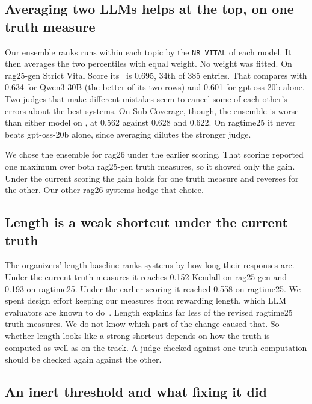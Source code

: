 \subsection{Averaging two LLMs helps at the top, on one truth measure}
\label{sec:ensemble}

Our ensemble ranks runs within each topic by the \texttt{NR\_VITAL} of each model.
It then averages the two percentiles with equal weight. No weight was fitted. On
rag25-gen Strict Vital Score its \tauap\ is 0.695, 34th of 385 entries. That
compares with 0.634 for Qwen3-30B (the better of its two rows) and 0.601 for
gpt-oss-20b alone. Two judges that make different mistakes seem to cancel some of
each other's errors about the best systems. On Sub Coverage, though, the ensemble
is worse than either model on \tauap, at 0.562 against 0.628 and 0.622. On
ragtime25 it never beats gpt-oss-20b alone, since averaging dilutes the stronger
judge.

We chose the ensemble for rag26 under the earlier scoring. That scoring reported
one maximum over both rag25-gen truth measures, so it showed only the gain. Under
the current scoring the gain holds for one truth measure and reverses for the
other. Our other rag26 systems hedge that choice.

\subsection{Length is a weak shortcut under the current truth}

The organizers' length baseline ranks systems by how long their responses are.
Under the current truth measures it reaches 0.152 Kendall on rag25-gen and 0.193 on
ragtime25. Under the earlier scoring it reached 0.558 on ragtime25. We spent design
effort keeping our measures from rewarding length, which LLM evaluators are known
to do~\cite{dubois2024length}. Length explains far less of the revised ragtime25
truth measures. We do not know which part of the change caused that.
So whether length looks like a strong shortcut depends on how the truth is computed
as well as on the track. A judge checked against one truth computation should be
checked again against the other.

\subsection{An inert threshold and what fixing it did}
\label{sec:floor}

